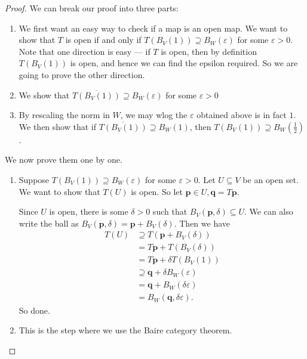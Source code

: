 \documentclass[a4paper]{article}
\begin{document}
\begin{proof}
  We can break our proof into three parts:
  \begin{enumerate}
    \item We first want an easy way to check if a map is an open map. We want to show that $T$ is open if and only if $T(B_V(1)) \supseteq B_W(\varepsilon)$ for some $\varepsilon > 0$. Note that one direction is easy --- if $T$ is open, then by definition $T(B_V(1))$ is open, and hence we can find the epsilon required. So we are going to prove the other direction.
    \item We show that $\overline{T(B_V(1))} \supseteq B_W(\varepsilon)$ for some $\varepsilon > 0$
    \item By rescaling the norm in $W$, we may wlog the $\varepsilon$ obtained above is in fact $1$. We then show that if $\overline{T(B_V(1))} \supseteq B_W(1)$, then $T(B_V(1)) \supseteq B_W(\frac{1}{2})$.
  \end{enumerate}
  We now prove them one by one.
  \begin{enumerate}
    \item Suppose $T(B_V(1))\supseteq B_W(\varepsilon)$ for some $\varepsilon > 0$. Let $U \subseteq V$ be an open set. We want to show that $T(U)$ is open. So let $\mathbf{p}\in U, \mathbf{q} = T\mathbf{p}$.

      Since $U$ is open, there is some $\delta > 0$ such that $B_V(\mathbf{p}, \delta) \subseteq U$. We can also write the ball as $B_V(\mathbf{p}, \delta) = \mathbf{p} + B_V(\delta)$. Then we have
      \begin{align*}
        T(U) &\supseteq T(\mathbf{p} + B_V(\delta)) \\
        &= T\mathbf{p} + T(B_V(\delta)) \\
        &= T\mathbf{p} + \delta T(B_V(1)) \\
        &\supseteq \mathbf{q} + \delta B_W(\varepsilon) \\
        &= \mathbf{q} + B_W(\delta\varepsilon)\\
        &= B_W(\mathbf{q}, \delta \varepsilon).
      \end{align*}
      So done.
    \item This is the step where we use the Baire category theorem.


\end{enumerate}
\end{proof}
\end{document}
